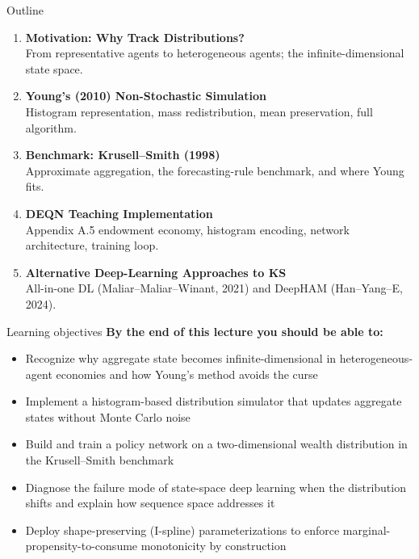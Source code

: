 \documentclass[aspectratio=169,11pt]{beamer}
\begin{document}
\begin{frame}{Outline}
\begin{enumerate}
    \item \textbf{Motivation: Why Track Distributions?}\\
    {\small From representative agents to heterogeneous agents; the infinite-dimensional state space.}

    \vspace{0.3em}
    \item \textbf{Young's (2010) Non-Stochastic Simulation}\\
    {\small Histogram representation, mass redistribution, mean preservation, full algorithm.}

    \vspace{0.3em}
    \item \textbf{Benchmark: Krusell--Smith (1998)}\\
    {\small Approximate aggregation, the forecasting-rule benchmark, and where Young fits.}

    \vspace{0.3em}
    \item \textbf{DEQN Teaching Implementation}\\
    {\small Appendix A.5 endowment economy, histogram encoding, network architecture, training loop.}

    \vspace{0.3em}
    \item \textbf{Alternative Deep-Learning Approaches to KS}\\
    {\small All-in-one DL (Maliar--Maliar--Winant, 2021) and DeepHAM (Han--Yang--E, 2024).}
\end{enumerate}
\end{frame}

\begin{frame}{Learning objectives}
\textbf{By the end of this lecture you should be able to:}
\begin{itemize}
  \item Recognize why aggregate state becomes infinite-dimensional in heterogeneous-agent economies and how Young's method avoids the curse
  \item Implement a histogram-based distribution simulator that updates aggregate states without Monte Carlo noise
  \item Build and train a policy network on a two-dimensional wealth distribution in the Krusell--Smith benchmark
  \item Diagnose the failure mode of state-space deep learning when the distribution shifts and explain how sequence space addresses it
  \item Deploy shape-preserving (I-spline) parameterizations to enforce marginal-propensity-to-consume monotonicity by construction
\end{itemize}
\end{frame}
\end{document}
